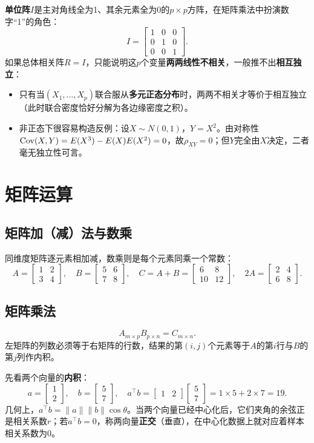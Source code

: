 \textbf{单位阵}$I$是主对角线全为1、其余元素全为0的$p\times p$方阵，在矩阵乘法中扮演数字“1”的角色：
\[
I=\begin{bmatrix}1&0&0\\0&1&0\\0&0&1\end{bmatrix}.
\]
如果总体相关阵$R=I$，只能说明这$p$个变量\textbf{两两线性不相关}，一般推不出\textbf{相互独立}：
\begin{itemize}
\item 只有当$(X_1,\ldots,X_p)$联合服从\textbf{多元正态分布}时，两两不相关才等价于相互独立（此时联合密度恰好分解为各边缘密度之积）。
\item 非正态下很容易构造反例：设$X\sim N(0,1)$，$Y=X^2$。由对称性$\operatorname{Cov}(X,Y)=E(X^3)-E(X)E(X^2)=0$，故$\rho_{XY}=0$；但$Y$完全由$X$决定，二者毫无独立性可言。
\end{itemize}

\section{矩阵运算}
\subsection{矩阵加（减）法与数乘}
同维度矩阵逐元素相加减，数乘则是每个元素同乘一个常数：
\[
A=\begin{bmatrix}1&2\\3&4\end{bmatrix},\quad
B=\begin{bmatrix}5&6\\7&8\end{bmatrix},\quad
C=A+B=\begin{bmatrix}6&8\\10&12\end{bmatrix},\quad
2A=\begin{bmatrix}2&4\\6&8\end{bmatrix}.
\]

\subsection{矩阵乘法}
\[
A_{m\times p}B_{p\times n}=C_{m\times n}.
\]
左矩阵的列数必须等于右矩阵的行数，结果的第$(i,j)$个元素等于$A$的第$i$行与$B$的第$j$列作内积。

先看两个向量的\textbf{内积}：
\[
a=\begin{bmatrix}1\\2\end{bmatrix},\quad b=\begin{bmatrix}5\\7\end{bmatrix},\quad
a^\top b=\begin{bmatrix}1&2\end{bmatrix}\begin{bmatrix}5\\7\end{bmatrix}
=1\times5+2\times7=19.
\]
几何上，$a^\top b=\|a\|\|b\|\cos\theta$。当两个向量已经中心化后，它们夹角的余弦正是相关系数$r$；若$a^\top b=0$，称两向量\textbf{正交}（垂直），在中心化数据上就对应着样本相关系数为0。

